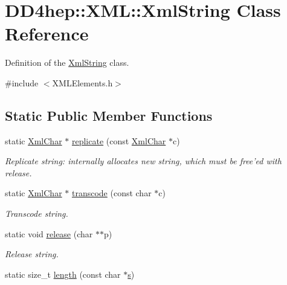 \hypertarget{class_d_d4hep_1_1_x_m_l_1_1_xml_string}{
\section{DD4hep::XML::XmlString Class Reference}
\label{class_d_d4hep_1_1_x_m_l_1_1_xml_string}
}


Definition of the \hyperlink{class_d_d4hep_1_1_x_m_l_1_1_xml_string}{XmlString} class.  


{\ttfamily \#include $<$XMLElements.h$>$}\subsection*{Static Public Member Functions}
\begin{DoxyCompactItemize}
\item 
static \hyperlink{namespace_d_d4hep_1_1_x_m_l_a09e5d9cc86ed782f6826dfe0778c1815}{XmlChar} $\ast$ \hyperlink{class_d_d4hep_1_1_x_m_l_1_1_xml_string_abdbc8c621c1b0f8659e89794aa9a38b5}{replicate} (const \hyperlink{namespace_d_d4hep_1_1_x_m_l_a09e5d9cc86ed782f6826dfe0778c1815}{XmlChar} $\ast$c)
\begin{DoxyCompactList}\small\item\em Replicate string: internally allocates new string, which must be free'ed with release. \item\end{DoxyCompactList}\item 
static \hyperlink{namespace_d_d4hep_1_1_x_m_l_a09e5d9cc86ed782f6826dfe0778c1815}{XmlChar} $\ast$ \hyperlink{class_d_d4hep_1_1_x_m_l_1_1_xml_string_af1afd620f73d33ad44ca67369e8d0b81}{transcode} (const char $\ast$c)
\begin{DoxyCompactList}\small\item\em Transcode string. \item\end{DoxyCompactList}\item 
static void \hyperlink{class_d_d4hep_1_1_x_m_l_1_1_xml_string_a42d7ff7f40a01e22f148a444526402ba}{release} (char $\ast$$\ast$p)
\begin{DoxyCompactList}\small\item\em Release string. \item\end{DoxyCompactList}\item 
static size\_\-t \hyperlink{class_d_d4hep_1_1_x_m_l_1_1_xml_string_aa4237a8d0f89aa98c8322ca4893c2b74}{length} (const char $\ast$\hyperlink{_volumes_8cpp_a17ca6bfc8040d695d3cada22a4763d40}{s})
$$
\end{DoxyCompactItemize}
